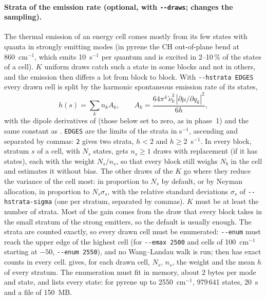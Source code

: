\paragraph{Strata of the emission rate (optional, with \texttt{-{}-draws};
changes the sampling).} The thermal emission of an energy cell comes
mostly from its few states with quanta in strongly emitting modes (in
pyrene the CH out-of-plane bend at 860~cm$^{-1}$, which emits
10~s$^{-1}$ per quantum and is excited in 2--10\,\% of the states of a
cell). $K$ uniform draws catch such a state in some blocks and not in
others, and the emission then differs a lot from block to block. With
\texttt{-{}-hstrata EDGES} every drawn cell is split by the harmonic
spontaneous emission rate of its states,
\[
h(s) = \sum_k n_k A_k,\qquad
A_k = \frac{64\pi^4\,\tilde\nu_k^3\,|\partial\mu/\partial q_k|^2}{6h},
\]
with the dipole derivatives of  (those below
 set to zero, as in phase~1) and the same constant as
. \texttt{EDGES} are the limits of the strata in
s$^{-1}$, ascending and separated by commas: \texttt{2} gives two strata,
$h<2$ and $h\ge2$~s$^{-1}$. In every block, stratum $s$ of a cell, with
$N_s$ states, gets $n_s\ge1$ draws with replacement (if it has states),
each with the weight $N_s/n_s$, so that every block still weighs $N_b$ in
the cell and estimates it without bias. The other draws of the $K$ go
where they reduce the variance of the cell most: in proportion to $N_s$
by default, or by Neyman allocation, in proportion to $N_s\sigma_s$, with
the relative standard deviations $\sigma_s$ of
\texttt{-{}-hstrata-sigma} (one per stratum, separated by commas). $K$
must be at least the number of strata. Most of the gain comes from the
draw that every block takes in the small stratum of the strong emitters,
so the default is usually enough. The strata are counted exactly, so
every drawn cell must be enumerated: \texttt{-{}-enum} must reach the
upper edge of the highest cell (for \texttt{-{}-emax 2500} and cells of
100~cm$^{-1}$ starting at $-50$, \texttt{-{}-enum 2550}), and no
Wang--Landau walk is run;  then has exact counts in
every cell.  gives, for each drawn cell, $N_s$,
$n_s$, the weight and the mean $h$ of every stratum. The enumeration must
fit in memory, about 2 bytes per mode and state, and
 lists every state: for pyrene up to
2550~cm$^{-1}$, 979\,641 states, 20~s and a file of 150~MB.

